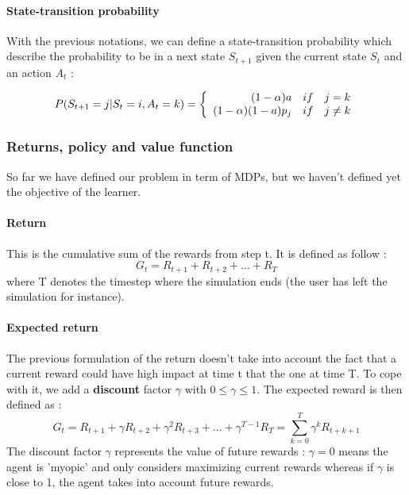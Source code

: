 \documentclass[a4paper]{article}
\begin{document}
\paragraph{State-transition probability} With the previous notations, we can define a state-transition probability which describe the probability to be in a next state $S_{t+1}$ given the current state $S_t$ and an action $A_t$ : 

\[ P(S_{t+1} = j | S_t = i, A_t = k ) =  \left \{
   \begin{array}{r c l}
      (1-\alpha)a  \quad  if \quad j = k \\
      (1-\alpha)(1-a)p_j  \quad  if \quad j \ne k \\
      
   \end{array}
   \right .
				  \]

	\subsubsection{Returns, policy and value function}

So far we have defined our problem in term of MDPs, but we haven't defined yet the objective of the learner. 

\paragraph{Return} This is the cumulative sum of the rewards from step t. It is defined as follow : 
\[
G_t =  R_{t+1} + R_{t+2} + ... + R_{T} 
\] where T denotes the timestep where the simulation ends (the user has left the simulation for instance). \\
\paragraph{Expected return} The previous formulation of the return doesn't take into account the fact that a current reward could have high impact at time t that the one at time T. To cope with it, we add a \textbf{discount} factor $\gamma$ with $0 \le \gamma \le 1$. The expected reward is then defined as : 
\[  G_t = R_{t+1} + \gamma R_{t+2} + \gamma^ 2 R_{t+3} + ... + \gamma^{T-1} R_{T} = \sum_{k=0}^{T}\gamma^k R_{t+k+1}            \]
The discount factor $\gamma$ represents the value of future rewards : $\gamma = 0$ means the agent is 'myopic' and only considers maximizing current rewards whereas if $\gamma$ is close to 1, the agent takes into account future rewards. 
\end{document}

